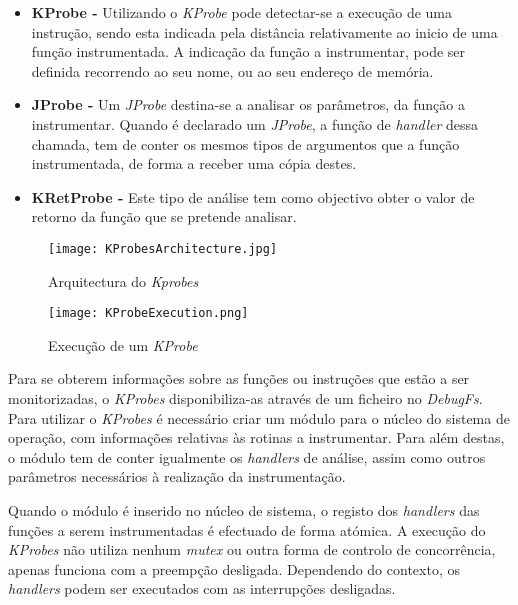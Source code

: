 \begin{itemize}
 \item \textbf{KProbe - } Utilizando o \textit{KProbe} pode detectar-se a execução de uma instrução, sendo esta indicada pela distância relativamente ao inicio de uma função instrumentada.
A indicação da função a instrumentar, pode ser definida recorrendo ao seu nome, ou ao seu endereço de memória.

\item \textbf{JProbe - } Um \textit{JProbe} destina-se a analisar os parâmetros, da função a instrumentar.
Quando é declarado um \textit{JProbe}, a função de \textit{handler} dessa chamada, tem de conter os mesmos tipos de argumentos que a função instrumentada, de forma a receber uma cópia destes.
 
 \item \textbf{KRetProbe - } Este tipo de análise tem como objectivo obter o valor de retorno da função que se pretende analisar.

\end{itemize}

\begin{figure}[!htb]
       \centering
       \texttt{[image: KProbesArchitecture.jpg]}
       \caption{Arquitectura do \textit{Kprobes} \cite{KProbesLwn}}
	\label{fig:kprobes_arch}
\end{figure}

\begin{figure}[!htb]
       \centering
       \texttt{[image: KProbeExecution.png]}
       \caption{Execução de um \textit{KProbe} \cite{KProbesLwn}}
	\label{fig:kprobe_execution}
\end{figure}

Para se obterem informações sobre as funções ou instruções que estão a ser monitorizadas, o \textit{KProbes} disponibiliza-as através de um ficheiro no \textit{DebugFs}.
Para utilizar o \textit{KProbes} é necessário criar um módulo para o núcleo do sistema de operação, com informações relativas às rotinas a instrumentar.
Para além destas, o módulo tem de conter igualmente os \textit{handlers} de análise, assim como outros parâmetros necessários à realização da instrumentação.

Quando o módulo é inserido no núcleo de sistema, o registo dos \textit{handlers} das funções a serem instrumentadas é efectuado de forma atómica.
A execução do \textit{KProbes} não utiliza nenhum \textit{mutex} ou outra forma de controlo de concorrência, apenas funciona com a preempção desligada.
Dependendo do contexto, os \textit{handlers} podem ser executados com as interrupções desligadas.


